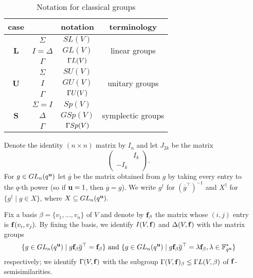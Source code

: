 \begin{table}[h] 
\centering
\caption{Notation for classical groups}
\begin{tabular}{|c|c|c|c|} 
\hline
case                                      &            & notation & terminology                        \\ \hline
\multirow{3}{*}{{\bf L}} & $\Sigma$   & $SL(V)$  & \multirow{3}{*}{linear groups}     \\ \cline{2-3}
                                          & $I=\Delta$ & $GL(V)$  &                                    \\ \cline{2-3}
           & $\Gamma$ & ${{\Gamma L}}(V)$  &                                    \\ \hline
\multirow{3}{*}{\bf U} & $\Sigma$   & $SU(V)$  & \multirow{3}{*}{unitary groups}    \\ \cline{2-3}
                                          & $I$        & $GU(V)$  &                                    \\ \cline{2-3}
& $\Gamma$        & ${{\Gamma U}}(V)$  &                                    \\ \hline
\multirow{3}{*}{\bf S} & $\Sigma=I$ & $Sp(V)$    & \multirow{3}{*}{symplectic groups} \\ \cline{2-3}
                                          & $\Delta$   & $GSp(V)$   &                                    \\ \cline{2-3}
& $\Gamma$        & ${{\Gamma Sp}}(V)$  &                                    \\ \hline
\end{tabular}
\label{classnot}
\end{table} 

Denote the identity $(n\times n)$ matrix by $I_n$  and let $J_{2k}$  be the matrix
\begin{equation*}
\begin{pmatrix}
    & I_k\\
 -I_k &     
\end{pmatrix}.
\end{equation*} 
For $g \in GL_n(q^{\bf u})$ let $\overline{g}$ be  the matrix obtained from $g$ by taking every entry to the $q$-th power (so if ${\bf u}=1$, then $\overline{g}=g$). 
We write $g^{\dagger}$ for $(\overline{g}^{\top})^{-1}$ and $X^{\dagger}$ for $\{g^{\dagger} \mid g \in X\}$, where $X \subseteq GL_n(q^{\bf u}).$

Fix a basis $\beta=\{v_1, \ldots , v_n\}$ of $V$ and denote by ${\bf f}_{\beta}$ the matrix whose $(i,j)$ entry is ${\bf f}(v_i,v_j).$ By fixing the basis, we identify $I(V, {\bf f})$ and $\Delta(V, {\bf f})$ with the matrix groups
\begin{equation}\label{unimatr}
\{g \in GL_n(q^{\bf u}) \mid g {\bf f}_{\beta}\overline{g}^{\top}={\bf f}_{\beta}\} \text{ and } \{g \in GL_n(q^{\bf u}) \mid g {\bf f}_{\beta}\overline{g}^{\top}=\lambda{\bf f}_{\beta}, \lambda \in \mathbb{F}_{q^{\bf u}}^*\}
\end{equation}
 respectively; we identify $\Gamma(V, {\bf f})$ with the subgroup  $\Gamma(V, {\bf f})_{\beta} \le {{\Gamma L}}(V, \beta)$ of ${\bf f}$-semisimilarities.


